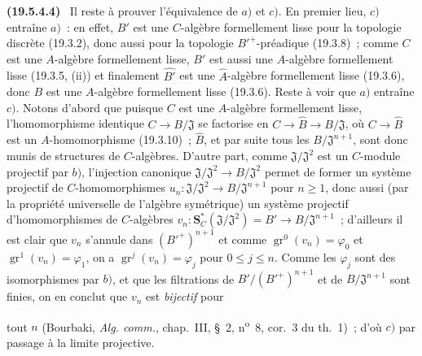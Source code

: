 \documentclass[10pt,oneside]{book}
\makeatletter
\newcommand{\gr}{\operatorname{gr}}
\newcommand{\setmanualcurrentlabel}[1]{\def\@currentlabel{#1}}
\newcommand{\oldpage}[2][]{%
  \setcounter{footnote}{0}%
  \marginpar{\scriptsize\textbf{#1}~|~#2}\ignorespaces}
\newenvironment{env}[1][]{\setmanualcurrentlabel{#1}\par\medskip\noindent\textbf{(#1)}\ }{\par}
\makeatother
\begin{document}
\begin{env}[19.5.4.4]
\label{0.19.5.4.4-fr}
Il reste à prouver l'équivalence de $a)$ et $c)$. En premier lieu, $c)$ entraîne
$a)$~: en effet, $B'$ est une $C$-algèbre formellement lisse pour la topologie
discrète (19.3.2), donc aussi pour la topologie ${B'}^+$-préadique (19.3.8)~;
comme $C$ est une $A$-algèbre formellement lisse, $B'$ est aussi une
$A$-algèbre formellement lisse (19.3.5, (ii)) et finalement $\widehat{B'}$ est
une $\widehat A$-algèbre formellement lisse (19.3.6), donc $B$ est une
$A$-algèbre formellement lisse (19.3.6). Reste à voir que $a)$ entraîne $c)$.
Notons d'abord que puisque $C$ est une $A$-algèbre formellement lisse,
l'homomorphisme identique $C\to B/\mathfrak J$ se factorise en
$C\to\widehat B\to B/\mathfrak J$, où $C\to\widehat B$ est un
$A$-homomorphisme (19.3.10)~; $\widehat B$, et par suite tous les
$B/\mathfrak J^{n+1}$, sont donc munis de structures de $C$-algèbres. D'autre
part, comme $\mathfrak J/\mathfrak J^2$ est un $C$-module projectif par $b)$,
l'injection canonique $\mathfrak J/\mathfrak J^2\to B/\mathfrak J^2$ permet de
former un système projectif de $C$-homomorphismes
$u_n:\mathfrak J/\mathfrak J^2\to B/\mathfrak J^{n+1}$ pour $n\geq1$, donc
aussi (par la propriété universelle de l'algèbre symétrique) un système
projectif d'homomorphismes de $C$-algèbres
$v_n:\mathbf S_C^*(\mathfrak J/\mathfrak J^2)=B'\to B/\mathfrak J^{n+1}$~;
d'ailleurs il est clair que $v_n$ s'annule dans $({B'}^+)^{n+1}$ et comme
$\gr^0(v_n)=\varphi_0$ et $\gr^1(v_n)=\varphi_1$, on a
$\gr^j(v_n)=\varphi_j$ pour $0\leq j\leq n$. Comme les $\varphi_j$ sont des
isomorphismes par $b)$, et que les filtrations de
$B'/({B'}^+)^{n+1}$ et de $B/\mathfrak J^{n+1}$ sont finies, on en conclut que
$v_n$ est \emph{bijectif} pour

\oldpage[0\textsubscript{IV-1}]{94}

tout $n$ (Bourbaki, \emph{Alg. comm.}, chap.~III, §~2,
n\textsuperscript{o}~8, cor.~3 du th.~1)~; d'où $c)$ par passage à la limite
projective.
\end{env}
\end{document}
